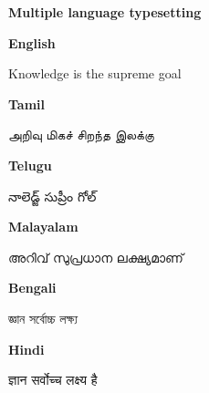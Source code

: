 \documentclass[a4paper,16pt]{article}
\begin{document}
 \textbf{\Large Multiple language typesetting}
\bigskip

\par \textbf{English} 
\par Knowledge is the supreme goal
\medskip

\textbf{Tamil}
\par {}
அறிவு மிகச் சிறந்த இலக்கு
\medskip

\textbf{Telugu} 
\par{}
నాలెడ్జ్ సుప్రీం గోల్
\medskip

\textbf{Malayalam} 
\par {}
അറിവ് സുപ്രധാന ലക്ഷ്യമാണ്
\medskip

\textbf{Bengali} 
\par{}
জ্ঞান সর্বোচ্চ লক্ষ্য
\medskip

\textbf{Hindi} 
\par {}
ज्ञान सर्वोच्च लक्ष्य है
\medskip
\end{document}
